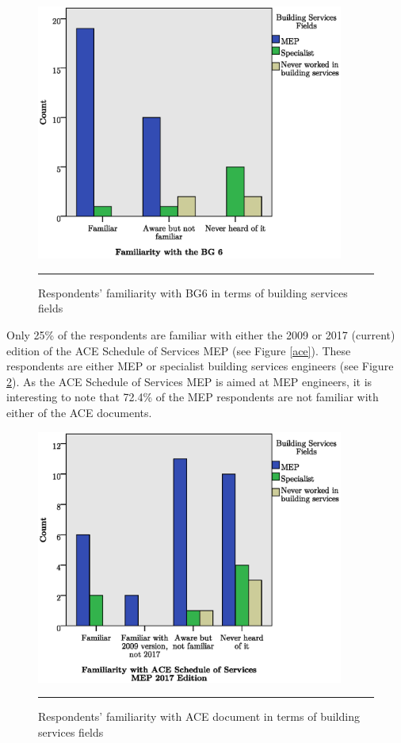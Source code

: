 \begin{figure}[htbp]
	\centering
	\includegraphics[width=0.9\textwidth]{figures/Bg6XBsFieldsCount.eps}
	\rule{0.9\textwidth}{0.5pt} %
	\caption{Respondents' familiarity with BG6 in terms of building services fields}
	\label{BG6_X_BS_fields}
\end{figure}



Only 25\% of the respondents are familiar with either the 2009 or 2017 (current) edition of the ACE Schedule of Services MEP (see Figure \ref{ace}).
These respondents are either MEP or specialist building services engineers (see Figure \ref{ACE_X_BS_fields}).
As the ACE Schedule of Services MEP is aimed at MEP engineers, it is interesting to note that 72.4\% of the MEP respondents are not familiar with either of the ACE documents.

\begin{figure}[htbp]
	\centering
	\includegraphics[width=0.9\textwidth]{figures/AceXBsFieldsCount.eps}
	\rule{0.9\textwidth}{0.5pt} %
	\caption{Respondents' familiarity with ACE document in terms of building services fields}
	\label{ACE_X_BS_fields}
\end{figure}








